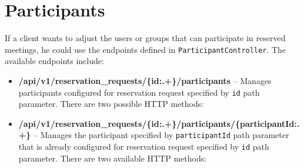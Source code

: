 \section{Participants}
If a client wants to adjust the users or groups that can participate in reserved meetings, he could use the endpoints defined in  \texttt{Participant\-Controller}.
The available endpoints include:
\begin{itemize}
    \item \textbf{/api/v1/reservation\_requests/\{id:.+\}/participants} -- Manages participants configured for reservation request specified by \texttt{id} path parameter. There are two possible HTTP methods:
    \item \textbf{/api/v1/reservation\_requests/\{id:.+\}/participants/\{participantId:.+\}} -- Manages the participant specified by \texttt{participantId} path parameter that is already configured for reservation request specified by \texttt{id} path parameter. There are two available HTTP methods:
\end{itemize}
